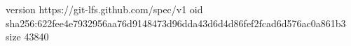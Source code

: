 version https://git-lfs.github.com/spec/v1
oid sha256:622fee4e7932956aa76d9148473d96dda43d6d4d86fef2fcad6d576ac0a861b3
size 43840
